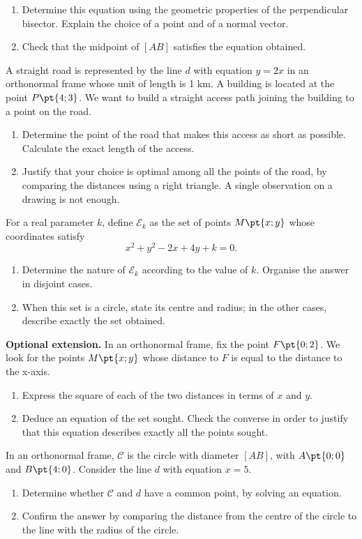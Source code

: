 \begin{enumerate}[label=\arabic*.]
\item Determine this equation using the geometric properties of the perpendicular bisector. Explain the choice of a point and of a normal vector.
\item Check that the midpoint of $[AB]$ satisfies the equation obtained.
\end{enumerate}
A straight road is represented by the line $d$ with equation $y=2x$ in an orthonormal frame whose unit of length is 1 km. A building is located at the point $P\pt{4;3}$. We want to build a straight access path joining the building to a point on the road.
\begin{enumerate}[label=\arabic*.]
\item Determine the point of the road that makes this access as short as possible. Calculate the exact length of the access.
\item Justify that your choice is optimal among all the points of the road, by comparing the distances using a right triangle. A single observation on a drawing is not enough.
\end{enumerate}
For a real parameter $k$, define $\mathcal E_k$ as the set of points $M\pt{x;y}$ whose coordinates satisfy\[x^2+y^2-2x+4y+k=0.\]
\begin{enumerate}[label=\arabic*.]
\item Determine the nature of $\mathcal E_k$ according to the value of $k$. Organise the answer in disjoint cases.
\item When this set is a circle, state its centre and radius; in the other cases, describe exactly the set obtained.
\end{enumerate}
\textbf{Optional extension.} In an orthonormal frame, fix the point $F\pt{0;2}$. We look for the points $M\pt{x;y}$ whose distance to $F$ is equal to the distance to the x-axis.
\begin{enumerate}[label=\arabic*.]
\item Express the square of each of the two distances in terms of $x$ and $y$.
\item Deduce an equation of the set sought. Check the converse in order to justify that this equation describes exactly all the points sought.
\end{enumerate}
In an orthonormal frame, $\mathcal C$ is the circle with diameter $[AB]$, with $A\pt{0;0}$ and $B\pt{4;0}$. Consider the line $d$ with equation $x=5$.
\begin{enumerate}[label=\arabic*.]
\item Determine whether $\mathcal C$ and $d$ have a common point, by solving an equation.
\item Confirm the answer by comparing the distance from the centre of the circle to the line with the radius of the circle.
\end{enumerate}

